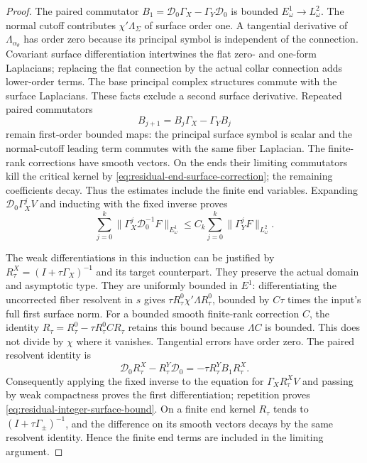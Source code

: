 \documentclass[11pt]{amsart}
\theoremstyle{definition}
\theoremstyle{remark}
\theoremstyle{plain}
\begin{document}
\begin{proof}
The paired commutator $B_1=\mathscr D_0\Gamma_X-
\Gamma_Y\mathscr D_0$ is bounded $E^1_\omega\to L^2_\omega$.
The normal cutoff contributes $\chi'\Lambda_\Sigma$ of surface
order one. A tangential derivative of $\Lambda_{\alpha_\theta}$
has order zero because its principal symbol is independent of the
connection. Covariant surface differentiation intertwines the flat
zero- and one-form Laplacians; replacing the flat connection by the
actual collar connection adds lower-order terms. The base principal
complex structures commute with the surface Laplacians. These facts
exclude a second surface derivative. Repeated paired commutators
\[
                         B_{j+1}=B_j\Gamma_X-\Gamma_YB_j
\]
remain first-order bounded maps: the principal surface symbol is
scalar and the normal-cutoff leading term commutes with the same
fiber Laplacian. The finite-rank corrections have smooth vectors.
On the ends their limiting commutators kill the critical kernel by
\eqref{eq:residual-end-surface-correction}; the remaining coefficients
decay. Thus the estimates include the finite end variables. Expanding
$\mathscr D_0\Gamma_X^j V$ and inducting with the fixed inverse
proves
\begin{equation}\label{eq:residual-integer-surface-bound}
 \sum_{j=0}^k\|\Gamma_X^j\mathscr D_0^{-1}F\|_{E^1_\omega}
          \leq C_k\sum_{j=0}^k\|\Gamma_Y^jF\|_{L^2_\omega}.
\end{equation}

The weak differentiations in this induction can be justified by
$R_\tau^X=(I+\tau\Gamma_X)^{-1}$ and its target counterpart.
They preserve the actual domain and asymptotic type. They are uniformly
bounded in $E^1$: differentiating the uncorrected fiber resolvent in
$s$ gives $\tau R_\tau^0\chi'\Lambda R_\tau^0$, bounded by
$C\tau$ times the input's full first surface norm. For a bounded
smooth finite-rank correction $C$, the identity
$R_\tau=R_\tau^0-\tau R_\tau^0 C R_\tau$ retains this bound
because $\Lambda C$ is bounded. This does not divide by $\chi$
where it vanishes. Tangential errors have order zero. The paired
resolvent identity is
\[
 \mathscr D_0R_\tau^X-R_\tau^Y\mathscr D_0
                         =-\tau R_\tau^Y B_1R_\tau^X.
\]
Consequently applying the fixed inverse to the equation for
$\Gamma_XR_\tau^XV$ and passing by weak compactness proves the
first differentiation; repetition proves
\eqref{eq:residual-integer-surface-bound}. On a finite end kernel
$R_\tau$ tends to $(I+\tau\Gamma_\pm)^{-1}$, and the difference
on its smooth vectors decays by the same resolvent identity. Hence
the finite end terms are included in the limiting argument.


\end{proof}
\end{document}
